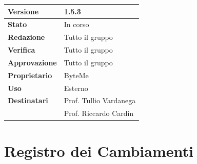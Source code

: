 \documentclass[11pt,a4paper]{article}
\begin{document}
\begin{titlepage}
    \begin{table}[H]
        \centering
        \begin{tabular}{|l|p{5cm}|}
            \hline
            \textbf{Versione} & 1.5.3 \\
            \hline
            \textbf{Stato} & In corso \\
            \hline
            \textbf{Redazione} & Tutto il gruppo \\
            \hline
            \textbf{Verifica} & Tutto il gruppo \\
            \hline
            \textbf{Approvazione} & Tutto il gruppo \\
            \hline
            \textbf{Proprietario} & ByteMe \\
            \hline
            \textbf{Uso} & Esterno \\
            \hline
            \textbf{Destinatari} & Prof. Tullio Vardanega \\ & Prof. Riccardo Cardin \\
            \hline
        \end{tabular}
    \end{table}
    
    \vfill
\end{titlepage}

\section*{Registro dei Cambiamenti}
\end{document}
